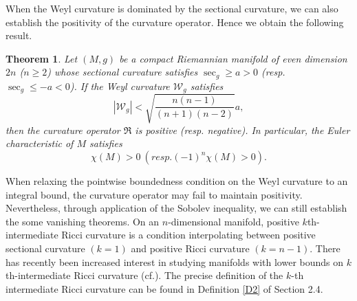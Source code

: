 \documentclass[12pt, twoside]{article}
\newtheorem{theorem}{Theorem}[section]
\theoremstyle{definition}
\numberwithin{equation}{section}
\begin{document}
When the Weyl curvature is dominated by the sectional curvature, we can also establish the positivity of the curvature operator. Hence we obtain the following result.
\begin{theorem}\label{T2}
	Let $(M,g)$ be a compact Riemannian manifold of even dimension $2n$ ($n \geq 2$) whose sectional curvature satisfies $\sec_g \geq a> 0$ (resp. $\sec_g \leq -a <0$). If the Weyl curvature $\mathcal{W}_g$ satisfies
$$|\mathcal{W}_{g}|<\sqrt{\frac{n(n-1)}{(n+1)(n-2)}}a,$$
then the curvature operator $\mathfrak{R}$ is positive (resp. negative). In particular,  the Euler characteristic of $M$ satisfies
$$\chi(M) > 0\ (resp. (-1)^n\chi(M)>0).$$
\end{theorem}

When relaxing the pointwise boundedness condition on the Weyl curvature to an integral bound, the curvature operator may fail to maintain positivity. Nevertheless, through application of the Sobolev inequality, we can still establish the some vanishing theorems. On an $n$-dimensional manifold, positive $k$th-intermediate Ricci curvature is a condition interpolating between positive sectional curvature $(k=1)$ and positive Ricci curvature $(k=n-1)$. There has recently been increased interest in studying manifolds with lower bounds on $k$th-intermediate Ricci curvature  (cf.\cite{KM18,Mou22,RW23,RS05}). The precise definition of the $k$-th intermediate Ricci curvature can be found in Definition \ref{D2} of Section 2.4.
\end{document}
